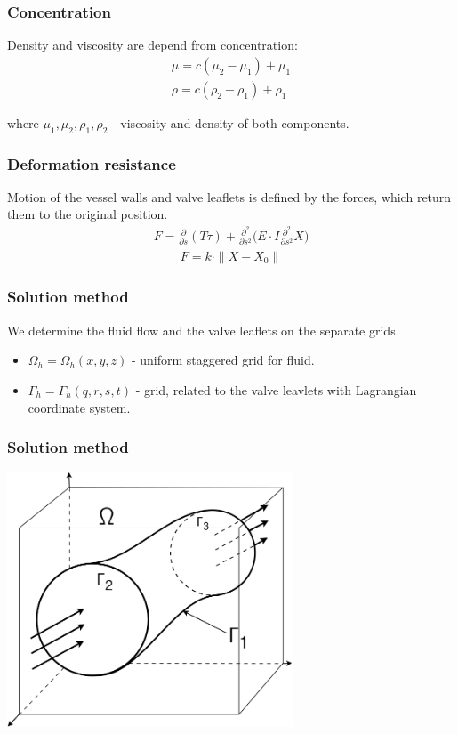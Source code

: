 \documentclass[14pt]{beamer}
\begin{document}
\begin{frame}
\frametitle{Concentration}
Density and viscosity are depend from concentration:
\begin{gather}
    \label{eq:concentration_viscosity}
    \mu = c (\mu_2 - \mu_1) + \mu_1\\
    \label{eq:concentration_density}
    \rho = c (\rho_2 - \rho_1) + \rho_1
\end{gather}

where $\mu_1, \mu_2, \rho_1, \rho_2$ - viscosity and density of both components.
\end{frame}

\begin{frame}
\frametitle{Deformation resistance}
Motion of the vessel walls and valve leaflets is defined by the forces, which return them to the original position.
\begin{gather}
    \label{eq:strain_energy}
    F =  \frac{\partial}{\partial s}(T \tau) + \frac{\partial^2}{\partial s^2} \Big( E \cdot I \frac{\partial^2}{\partial s^2} X \Big)
\end{gather}
\begin{gather}
    \label{eq:define_boundary_force}
    F = k \cdot \|X - X_0\|
\end{gather}
\end{frame}

\begin{frame}
\frametitle{Solution method}
We determine the fluid flow and the valve leaflets on the separate grids
\begin{itemize}
    \item[\MVRightarrow] $\Omega_h = \Omega_h(x, y, z)$ - uniform staggered grid for fluid.
    \item[\MVRightarrow] $\Gamma_h = \Gamma_h(q, r, s, t)$ - grid, related to the valve leavlets with Lagrangian coordinate system.
\end{itemize}

\end{frame}

\begin{frame}
\frametitle{Solution method}
    \begin{center}
        \includegraphics[width=8.5cm]{area_ibm_3d.png}
    \end{center}
\end{frame}
\end{document}

